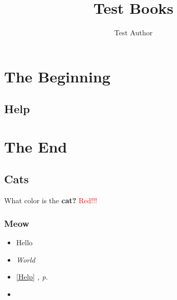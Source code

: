 \documentclass[12pt, openany]{book}
\begin{document}
\title{Test Books}
\author{Test Author}
\date{ }
\maketitle
\tableofcontents
\part{The Beginning}
\chapter{Help}
\label{Help}
\part{The End}
\chapter{Cats}
What color is the \textbf{cat?}
\textcolor{red}{Red!!!}
\section{Meow}
\begin{itemize}
\item{Hello}
\item{\textit{World}}
\item{\autoref{Help} \textit{, p. \pageref{Help} }}
\item{}
\end{itemize}
\printindex
\end{document}

